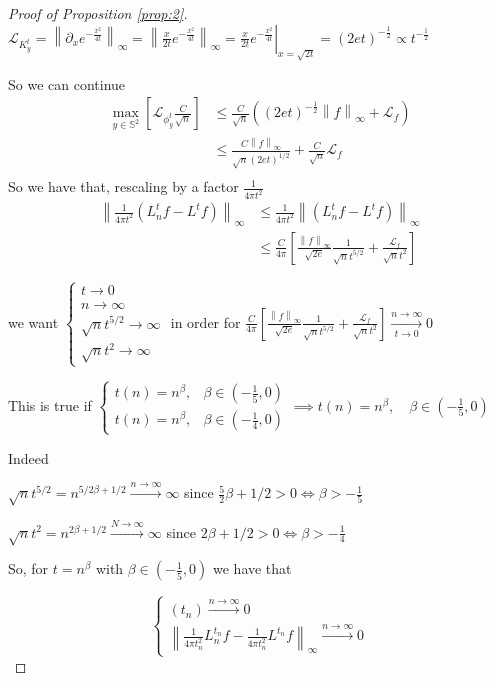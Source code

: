 \documentclass{article} %
\newcommand{\norm}[1]{\left\lVert#1\right\rVert}
\begin{document}
\begin{proof}[Proof of Proposition \ref{prop:2}]
$\mathcal L_{K^t_y} = \norm{\partial_x e^{-\frac{x^2}{4t}}}_\infty = \norm{\frac{x}{2t}e^{-\frac{x^2}{4t}}}_\infty = \left. \frac{x}{2t}e^{-\frac{x^2}{4t}}\right|_{x=\sqrt{2t}}=(2et)^{-\frac{1}{2}}\propto t ^ {-\frac{1}{2}}$

So we can continue
$$\begin{aligned}
	\max _{y\in \mathbb S^2} \left[  \mathcal L_{\phi^t_y} \frac{C}{\sqrt{n}} \right]
	&\leq  \frac{C}{\sqrt{n}} \left( (2et)^{-\frac{1}{2}} \norm{f}_\infty + \mathcal L_f \right)\\
	&\leq \frac{C\norm{f}_\infty}{\sqrt{n}(2et)^{1/2}} +   \frac{C}{\sqrt{n}}\mathcal L_f\\
\end{aligned}$$
So we have that, rescaling by a factor $\frac{1}{4\pi t^2}$
\begin{align*}
	\norm{\frac{1}{4\pi t^2}\left(L_n^tf-L^tf\right)}_\infty&\leq \frac{1}{4\pi t^2}\norm{\left(L_n^tf-L^tf\right)}_\infty \\
	&\leq \frac{C}{4\pi}\left[\frac{\norm{f}_\infty}{\sqrt{2e}}\frac{1}{\sqrt{n}t^{5/2}} + \frac{\mathcal L_f}{\sqrt{n}t^2}\right]
\end{align*}

we want $\begin{cases}
t \rightarrow 0\\
n \rightarrow \infty\\
\sqrt{n}t^{5/2} \rightarrow \infty\\
\sqrt{n}t^2 \rightarrow \infty
\end{cases}$ in order for $ \frac{C}{4\pi}\left[\frac{\norm{f}_\infty}{\sqrt{2e}}\frac{1}{\sqrt{n}t^{5/2}} + \frac{\mathcal L_f}{\sqrt{n}t^2}\right] \xrightarrow[t\to 0 ]{n\to\infty}0$

This is true if $\begin{cases}
t(n) = n^\beta, &\beta\in(-\frac{1}{5}, 0) \\
t(n) = n^\beta, &\beta\in(-\frac{1}{4}, 0)
\end{cases} \implies t(n) = n^\beta, \quad \beta\in(-\frac{1}{5}, 0)$

Indeed 

$\sqrt{n}t^{5/2}=n^{5/2\beta+1/2}\xrightarrow{n \to \infty} \infty$ since $\frac{5}{2}\beta+1/2>0 \iff \beta>-\frac{1}{5}$

$\sqrt{n}t^2=n^{2\beta+1/2}\xrightarrow {N \to \infty} \infty$ since $2\beta+1/2>0 \iff \beta>-\frac{1}{4}$

So, for $t=n^\beta$ with $\beta\in(-\frac{1}{5}, 0)$ we have that 

$$\begin{cases}
(t_n)\xrightarrow{n\to\infty}0\\
\norm{\frac{1}{4\pi t_n^2}L_n^{t_n}f-\frac{1}{4\pi t_n^2}L^{t_n}f}_\infty  \xrightarrow{n\to\infty}0
\end{cases}$$
	
\end{proof}
\end{document}
